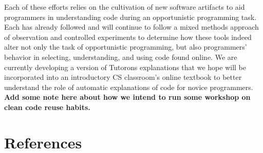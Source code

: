 \documentclass[12pt]{memoir}
\begin{document}
Each of these efforts relies on the cultivation of new software artifacts to aid programmers in understanding code during an opportunistic programming task.
Each has already followed and will continue to follow a mixed methods approach of observation and controlled experiments to determine how these tools indeed alter not only the task of opportunistic programming, but also programmers' behavior in selecting, understanding, and using code found online.
We are currently developing a version of Tutorons explanations that we hope will be incorporated into an introductory CS classroom's online textbook to better understand the role of automatic explanations of code for novice programmers.
\textbf{Add some note here about how we intend to run some workshop on clean code reuse habits.}
\fi

\section{References}
\printbibliography[heading=none]
\end{document}
